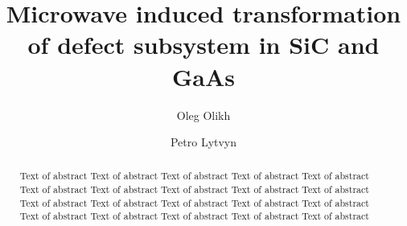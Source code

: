 \documentclass[final,3p,times,twocolumn,authoryear]{elsarticle}
\begin{document}
\begin{frontmatter}



\title{Microwave induced transformation of defect subsystem in SiC and GaAs}


\author[label1]{Oleg Olikh}

\author[label2]{Petro Lytvyn}

\begin{abstract}
Text of abstract Text of abstract Text of abstract Text of abstract
Text of abstract Text of abstract Text of abstract Text of abstract
Text of abstract Text of abstract Text of abstract Text of abstract
Text of abstract Text of abstract Text of abstract Text of abstract
Text of abstract Text of abstract Text of abstract Text of abstract
\end{abstract}


\end{frontmatter}
\end{document}
